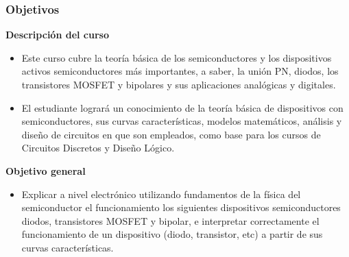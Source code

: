 \documentclass[10pt,t,aspectratio=169]{beamer}
\begin{document}
\begin{frame}[t]
\frametitle{Objetivos}
\textbf{Descripción del curso}

\begin{itemize}
	\item Este curso cubre la teoría básica de los semiconductores y los dispositivos activos semiconductores más importantes, a saber, la unión PN, diodos, los transistores MOSFET y bipolares y sus aplicaciones analógicas y digitales.
	\item El estudiante logrará un conocimiento de la teoría básica de dispositivos con semiconductores, sus curvas características, modelos matemáticos, análisis y diseño de circuitos en que son empleados, como base para los cursos de Circuitos Discretos y Diseño Lógico.
\end{itemize}

\vspace{3mm}
\textbf{Objetivo general}

\begin{itemize}
	\item Explicar a nivel electrónico utilizando fundamentos de la física del semiconductor el funcionamiento los siguientes dispositivos semiconductores diodos, transistores MOSFET y bipolar, e interpretar correctamente el funcionamiento de un dispositivo (diodo, transistor, etc) a partir de sus curvas características.
\end{itemize}


\end{frame}
\end{document}
